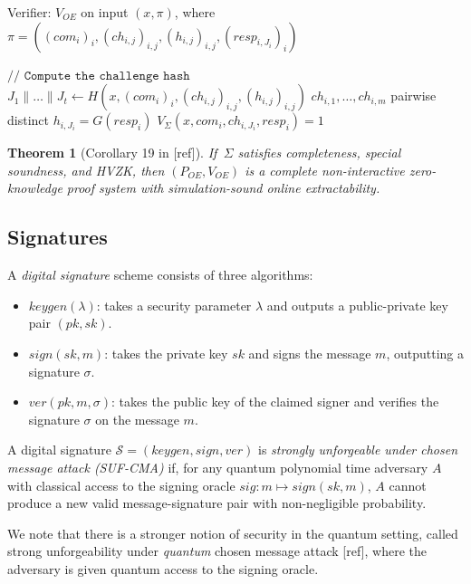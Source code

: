 \documentclass{amsart}
\theoremstyle{plain}
\newtheorem{thm}{Theorem}[section]
\theoremstyle{remark}
\numberwithin{equation}{section}
\begin{document}
\begin{algorithm}
\caption*{Verifier: $V_{OE}$ on input $(x,\pi)$, where $\pi = ((com_i)_i, (ch_{i,j})_{i,j}, (h_{i,j})_{i,j}, (resp_{i,J_i})_i)$}
\begin{algorithmic}
\STATE $\texttt{// Compute the challenge hash}$
\STATE $J_1 \| \dots \| J_t \leftarrow H(x, (com_i)_i, (ch_{i,j})_{i,j}, (h_{i,j})_{i,j})$ 
\vspace{2mm}
	 $ch_{i,1},\dots,ch_{i,m}$ pairwise distinct
	 $h_{i,J_i} = G(resp_i)$
	 $V_\Sigma(x,com_i, ch_{i,J_i}, resp_i) = 1$
\ENDFOR
{}
\ENDIF
\end{algorithmic}
\end{algorithm}

\begin{thm}[Corollary 19 in {[ref]}]
If $\,\Sigma$ satisfies completeness, special soundness, and HVZK, then $(P_{OE}, V_{OE})$ is a complete non-interactive zero-knowledge proof system with simulation-sound online extractability.
\end{thm}

\subsection{Signatures}
A \emph{digital signature} scheme consists of three algorithms:
\begin{itemize}
	\item 
	$keygen(\lambda)$: takes a security parameter $\lambda$ and outputs a public-private key pair $(pk,sk)$.

	\item
	$sign(sk, m)$: takes the private key $sk$ and signs the message $m$, outputting a signature $\sigma$.

	\item
	$ver(pk, m, \sigma)$: takes the public key of the claimed signer and verifies the signature $\sigma$ on the message $m$.
\end{itemize}

A digital signature $\mathcal{S} = (keygen, sign, ver)$ is \emph{strongly unforgeable under chosen message attack (SUF-CMA)} if, for any quantum polynomial time adversary $A$ with classical access to the signing oracle $sig: m \mapsto sign(sk,m)$, $A$ cannot produce a new valid message-signature pair with non-negligible probability.

\ifx
We note that there is a stronger notion of security in the quantum setting, called strong unforgeability under \emph{quantum} chosen message attack [ref], where the adversary is given quantum access to the signing oracle.
\fi
\end{document}
